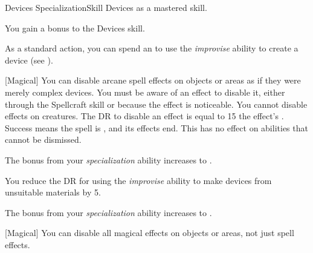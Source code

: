     \begin{feat}{Devices Specialization}{Skill}
        \featpre Devices as a mastered skill.

         You gain a  bonus to the Devices skill.

         As a standard action, you can spend an  to use the \textit{improvise} ability to create a device (see ).

        [Magical] You can disable arcane spell effects on objects or areas as if they were merely complex devices.
        You must be aware of an effect to disable it, either through the Spellcraft skill or because the effect is noticeable.
        You cannot disable effects on creatures.
        The DR to disable an effect is equal to 15 \add the effect's .
        Success means the spell is , and its effects end.
        This has no effect on abilities that cannot be dismissed.

         The bonus from your \textit{specialization} ability increases to .

         You reduce the DR for using the \textit{improvise} ability to make devices from unsuitable materials by 5.

         The bonus from your \textit{specialization} ability increases to .

        [Magical] You can disable all magical effects on objects or areas, not just spell effects.
    \end{feat}

